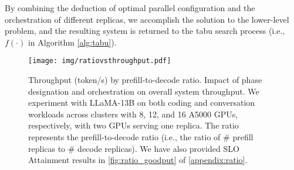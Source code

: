 By combining the deduction of optimal parallel configuration and the orchestration of different replicas, we accomplish the solution to the lower-level problem, and the resulting system  is returned to the tabu search process (i.e., $f(\cdot)$ in Algorithm \ref{alg:tabu}).




\begin{figure}
    \centering
    \texttt{[image: img/ratiovsthroughput.pdf]}
    \vspace{-2em}
    \caption{\small{Throughput (token/s) by prefill-to-decode ratio. Impact of phase designation and orchestration on overall system throughput. We experiment with LLaMA-13B on both coding and conversation workloads across clusters with 8, 12, and 16 A5000 GPUs, respectively, with two GPUs serving one replica. The ratio represents the prefill-to-decode ratio (i.e., the ratio of \# prefill replicas to \# decode replicas). We have also provided SLO Attainment results in \autoref{fig:ratio_goodput} of \autoref{appendix:ratio}.}}
    \label{tab:throughputvsratio}
    \vspace{-1em}
\end{figure}


